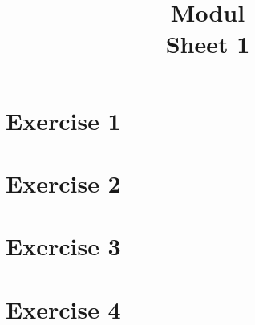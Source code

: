 \documentclass[bibliography=totocnumbered]{scrartcl}
\title{Modul\\Sheet 1}
\begin{document}
    \maketitle
    \tableofcontents
    \listoffigures
    
    
    \newpage
    \section{Exercise 1}

    \newpage
    \section{Exercise 2}

    \newpage
    \section{Exercise 3}

    \newpage
    \section{Exercise 4}

    \newpage
    \appendix
    \printbibliography[title={Sources}]
\end{document}
